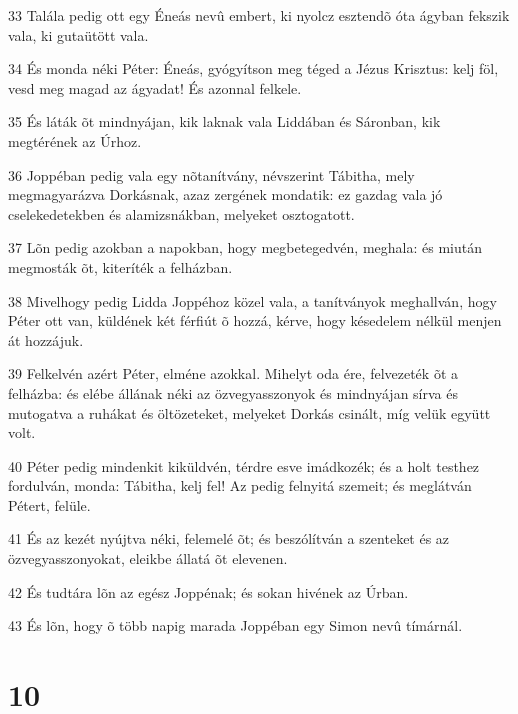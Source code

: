 \par 33 Talála pedig ott egy Éneás nevû embert, ki nyolcz esztendõ óta ágyban fekszik vala, ki gutaütött vala.
\par 34 És monda néki Péter: Éneás, gyógyítson meg téged a Jézus Krisztus: kelj föl, vesd meg magad az ágyadat! És azonnal felkele.
\par 35 És láták õt mindnyájan, kik laknak vala Liddában és Sáronban, kik megtérének az Úrhoz.
\par 36 Joppéban pedig vala egy nõtanítvány, névszerint Tábitha, mely megmagyarázva Dorkásnak, azaz zergének mondatik: ez gazdag vala jó cselekedetekben és alamizsnákban, melyeket osztogatott.
\par 37 Lõn pedig azokban a napokban, hogy megbetegedvén, meghala: és miután megmosták õt, kiteríték a felházban.
\par 38 Mivelhogy pedig Lidda Joppéhoz közel vala, a tanítványok meghallván, hogy Péter ott van, küldének két férfiút õ hozzá, kérve, hogy késedelem nélkül menjen át hozzájuk.
\par 39 Felkelvén azért Péter, elméne azokkal. Mihelyt oda ére, felvezeték õt a felházba: és elébe állának néki az özvegyasszonyok és mindnyájan sírva és mutogatva a ruhákat és öltözeteket, melyeket Dorkás csinált, míg velük együtt volt.
\par 40 Péter pedig mindenkit kiküldvén, térdre esve imádkozék; és a holt testhez fordulván, monda: Tábitha, kelj  fel! Az pedig felnyitá szemeit; és meglátván Pétert, felüle.
\par 41 És az kezét nyújtva néki, felemelé õt; és beszólítván a szenteket és az özvegyasszonyokat, eleikbe állatá õt elevenen.
\par 42 És tudtára lõn az egész Joppénak; és sokan hivének az Úrban.
\par 43 És lõn, hogy õ több napig marada Joppéban egy Simon nevû tímárnál.

\chapter{10}

